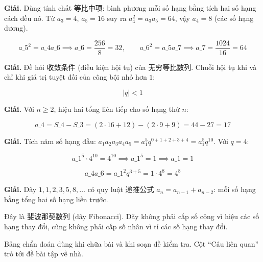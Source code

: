 \documentclass[11pt, a4paper]{article}
\begin{document}
\begin{dapan}[11 — Đáp án A]
\textbf{Giải.} Dùng tính chất 等比中项: bình phương mỗi số hạng bằng tích hai số hạng cách đều nó. Từ $a_3 = 4$, $a_5 = 16$ suy ra $a_4^2 = a_3 a_5 = 64$, vậy $a_4 = 8$ (các số hạng dương).

$$a\_5^2 = a\_4 a\_6 \implies a\_6 = \frac{256}{8} = 32, \qquad a\_6^2 = a\_5 a\_7 \implies a\_7 = \frac{1024}{16} = 64$$
\end{dapan}

\begin{dapan}[12 — Đáp án C]
\textbf{Giải.} Đề hỏi 收敛条件 (điều kiện hội tụ) của 无穷等比数列. Chuỗi hội tụ khi và chỉ khi giá trị tuyệt đối của công bội nhỏ hơn $1$:

$$\lvert q \rvert < 1$$
\end{dapan}

\begin{dapan}[13 — Đáp án C]
\textbf{Giải.} Với $n \ge 2$, hiệu hai tổng liên tiếp cho số hạng thứ $n$:

$$a\_4 = S\_4 - S\_3 = (2 \cdot 16 + 12) - (2 \cdot 9 + 9) = 44 - 27 = 17$$
\end{dapan}

\begin{dapan}[14 — Đáp án C]
\textbf{Giải.} Tích năm số hạng đầu: $a_1 a_2 a_3 a_4 a_5 = a_1^5 q^{0+1+2+3+4} = a_1^5 q^{10}$. Với $q = 4$:

$$a\_1^5 \cdot 4^{10} = 4^{10} \implies a\_1^5 = 1 \implies a\_1 = 1$$

$$a\_4 a\_6 = a\_1^2 q^{3 + 5} = 1 \cdot 4^8 = 4^8$$
\end{dapan}

\begin{dapan}[15 — Đáp án C]
\textbf{Giải.} Dãy $1, 1, 2, 3, 5, 8, \ldots$ có quy luật 递推公式 $a_n = a_{n-1} + a_{n-2}$: mỗi số hạng bằng tổng hai số hạng liền trước.

Đây là 斐波那契数列 (dãy Fibonacci). Dãy không phải cấp số cộng vì hiệu các số hạng thay đổi, cũng không phải cấp số nhân vì tỉ các số hạng thay đổi.
\end{dapan}

\clearpage
{}

Bảng chẩn đoán dùng khi chữa bài và khi soạn đề kiểm tra. Cột ``Câu liên quan'' trỏ tới đề bài tập về nhà.
\end{document}
